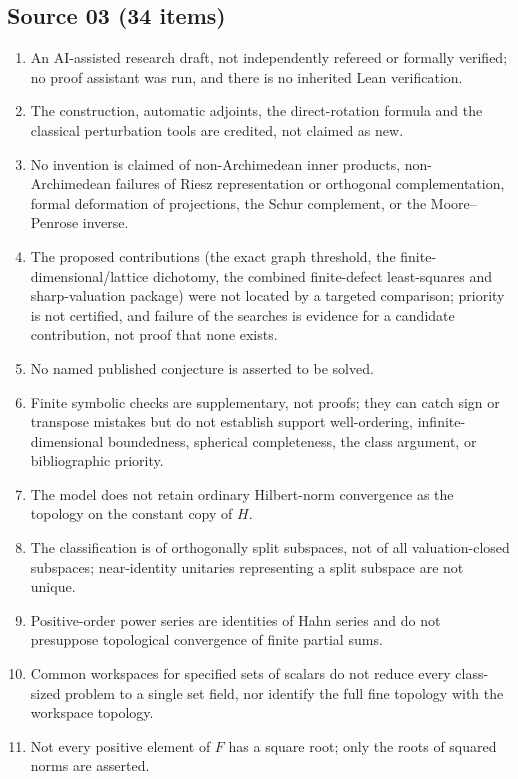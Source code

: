 \documentclass[11pt,letterpaper]{article}
\numberwithin{equation}{section}
\theoremstyle{definition}
\theoremstyle{remark}
\newcommand{\F}{F}
\begin{document}
\subsection{Source 03 (34 items)}
\begin{enumerate}[leftmargin=*,widest=00,label=03.\arabic*]
\item An AI-assisted research draft, not independently refereed or formally
verified; no proof assistant was run, and there is no inherited Lean
verification.
\item The construction, automatic adjoints, the direct-rotation formula and
the classical perturbation tools are credited, not claimed as new.
\item No invention is claimed of non-Archimedean inner products,
non-Archimedean failures of Riesz representation or orthogonal
complementation, formal deformation of projections, the Schur complement, or
the Moore--Penrose inverse.
\item The proposed contributions (the exact graph threshold, the
finite-dimensional/lattice dichotomy, the combined finite-defect
least-squares and sharp-valuation package) were not located by a targeted
comparison; priority is not certified, and failure of the searches is
evidence for a candidate contribution, not proof that none exists.
\item No named published conjecture is asserted to be solved.
\item Finite symbolic checks are supplementary, not proofs; they can catch
sign or transpose mistakes but do not establish support well-ordering,
infinite-dimensional boundedness, spherical completeness, the class argument,
or bibliographic priority.
\item The model does not retain ordinary Hilbert-norm convergence as the
topology on the constant copy of $H$.
\item The classification is of orthogonally split subspaces, not of all
valuation-closed subspaces; near-identity unitaries representing a split
subspace are not unique.
\item Positive-order power series are identities of Hahn series and do not
presuppose topological convergence of finite partial sums.
\item Common workspaces for specified sets of scalars do not reduce every
class-sized problem to a single set field, nor identify the full fine
topology with the workspace topology.
\item Not every positive element of $\F$ has a square root; only the roots of
squared norms are asserted.

\end{enumerate}
\end{document}
